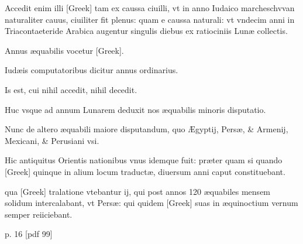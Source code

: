 \begin{parnumbers}
Accedit enim illi \textgreek{[Greek]}
tam ex caussa ciuilli, vt in anno Iudaico marcheschvvan naturaliter
cauus, ciuiliter fit plenus: quam e caussa naturali: vt vndecim anni
in Triacontaeteride Arabica augentur singulis diebus ex ratiociniis
Lunæ collectis.

Annus æquabilis vocetur \textgreek{[Greek]}.

Iudæis computatoribus
dicitur annus ordinarius.

Is est, cui nihil accedit, nihil decedit.

Huc vsque ad annum Lunarem deduxit nos æquabilis minoris
disputatio.

Nunc de altero æquabili maiore disputandum, quo Ægyptij,
Persæ, \& Armenij, Mexicani, \& Perusiani vsi.

Hic antiquitus
Orientis nationibus vnus idemque fuit: præter quam si quando \textgreek{[Greek]}
quinque in alium locum traductæ, diuersum anni caput constituebant.

qua \textgreek{[Greek]} tralatione vtebantur ij, qui post annos 120
æquabiles mensem solidum intercalabant, vt Persæ: qui quidem \textgreek{[Greek]}
suas in æquinoctium vernum semper reiiciebant.

\end{parnumbers}
\clearpage
p. 16 [pdf 99]
